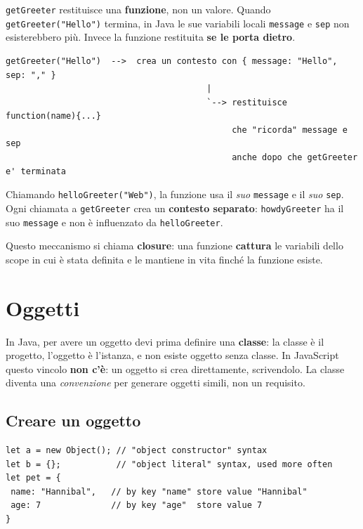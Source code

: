 \documentclass[10pt,a4paper]{article}
\begin{document}
\texttt{getGreeter} restituisce una \textbf{funzione}, non un valore. Quando \texttt{getGreeter("Hello")} termina, in Java le sue variabili locali \texttt{message} e \texttt{sep} non esisterebbero più. Invece la funzione restituita \textbf{se le porta dietro}.

\begin{lstlisting}[style=plain]
getGreeter("Hello")  -->  crea un contesto con { message: "Hello", sep: "," }
                                        |
                                        `--> restituisce function(name){...}
                                             che "ricorda" message e sep
                                             anche dopo che getGreeter e' terminata
\end{lstlisting}

Chiamando \texttt{helloGreeter("Web")}, la funzione usa il \emph{suo} \texttt{message} e il \emph{suo} \texttt{sep}. Ogni chiamata a \texttt{getGreeter} crea un \textbf{contesto separato}: \texttt{howdyGreeter} ha il suo \texttt{message} e non è influenzato da \texttt{helloGreeter}.

Questo meccanismo si chiama \textbf{closure}: una funzione \textbf{cattura} le variabili dello scope in cui è stata definita e le mantiene in vita finché la funzione esiste.

\section{Oggetti}

In Java, per avere un oggetto devi prima definire una \textbf{classe}: la classe è il progetto, l'oggetto è l'istanza, e non esiste oggetto senza classe. In JavaScript questo vincolo \textbf{non c'è}: un oggetto si crea direttamente, scrivendolo. La classe diventa una \emph{convenzione} per generare oggetti simili, non un requisito.

\subsection{Creare un oggetto}

\begin{lstlisting}[style=js]
let a = new Object(); // "object constructor" syntax
let b = {};           // "object literal" syntax, used more often
let pet = {
 name: "Hannibal",   // by key "name" store value "Hannibal"
 age: 7              // by key "age"  store value 7
}
\end{lstlisting}
\end{document}
